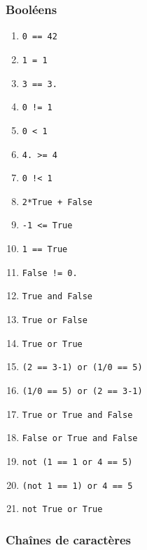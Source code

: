 \begin{multicols}{2}
\subsubsection*{Booléens}
\setcounter{numques}{0}
  \begin{enumerate}[label=\emph{\alph*)}]
    \item \texttt{0 == 42}
    \item \texttt{1 = 1}
    \item \texttt{3 == 3.}
    \item \texttt{0 != 1}
    \item \texttt{0 < 1}
    \item \texttt{4. >= 4}
    \item \texttt{0 !< 1}
    \item \texttt{2*True + False}
    \item \texttt{-1 <= True}
    \item \texttt{1 == True}
    \item \texttt{False != 0.}
    \item \texttt{True and False}
    \item \texttt{True or False}
    \item \texttt{True or True}
        \item \texttt{(2 == 3-1) or (1/0 == 5)}
    \item \texttt{(1/0 == 5) or (2 == 3-1)}
    \item \texttt{True or True and False}
    \item \texttt{False or True and False}    
    \item \texttt{not (1 == 1 or 4 == 5)}
    \item \texttt{(not 1 == 1) or 4 == 5}
    \item \texttt{not True or True}
  \end{enumerate}
  
\subsubsection*{Chaînes de caractères}



\end{multicols}
